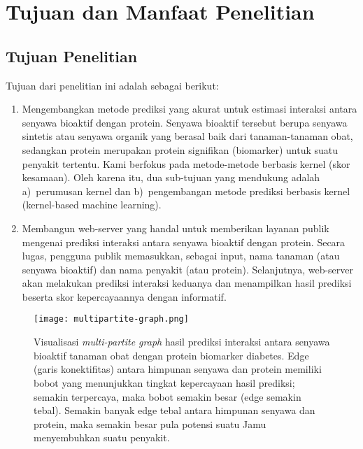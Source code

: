 \chapter{Tujuan dan Manfaat Penelitian}

\section{Tujuan Penelitian}

Tujuan dari penelitian ini adalah sebagai berikut:
\begin{enumerate} [topsep=0mm]
\itemsep0mm

\item
Mengembangkan metode prediksi yang akurat untuk estimasi interaksi antara senyawa bioaktif dengan protein.
Senyawa bioaktif tersebut berupa senyawa sintetis atau senyawa organik yang berasal baik dari tanaman-tanaman obat, 
sedangkan protein merupakan protein signifikan (biomarker) untuk suatu penyakit tertentu.
Kami berfokus pada metode-metode berbasis kernel (skor kesamaan).
Oleh karena itu, dua sub-tujuan yang mendukung adalah 
a)~perumusan kernel dan 
b)~pengembangan metode prediksi berbasis kernel (kernel-based machine learning).

\item
Membangun web-server yang handal untuk memberikan layanan publik mengenai prediksi interaksi antara senyawa bioaktif dengan protein.
Secara lugas, pengguna publik memasukkan, sebagai input, nama tanaman (atau senyawa bioaktif) dan nama penyakit (atau protein).
Selanjutnya, web-server akan melakukan prediksi interaksi keduanya dan menampilkan hasil prediksi beserta skor kepercayaannya dengan informatif.

\end{enumerate}

\begin{figure}[!b]
	\centering
	\texttt{[image: multipartite-graph.png]}
	\caption{Visualisasi \emph{multi-partite graph} hasil prediksi interaksi antara senyawa bioaktif tanaman obat dengan protein biomarker diabetes.
	Edge (garis konektifitas) antara himpunan senyawa dan protein memiliki bobot yang menunjukkan tingkat kepercayaan hasil prediksi; semakin terpercaya, maka bobot semakin besar (edge semakin tebal).
	Semakin banyak edge tebal antara himpunan senyawa dan protein, maka semakin besar pula potensi suatu Jamu menyembuhkan suatu penyakit.}
	\label{fig:multipartite_graph}
\end{figure}

